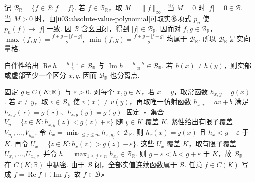 \begin{FAProof}
记 \(\displaystyle\mathcal B_{\mathbb R}=\{f\in\mathcal B:f=\overline f\}\). 若 \(\displaystyle f\in\mathcal B_{\mathbb R}\)，取 \(\displaystyle M=\|f\|_\infty\). 当 \(\displaystyle M=0\) 时 \(\displaystyle|f|=0\in\mathcal B\). 当 \(\displaystyle M>0\) 时，由\autoref{ii03:absolute-value-polynomial}可取实多项式 \(\displaystyle p_n\) 使 \(\displaystyle p_n(f)\to|f|\) 一致. 因 \(\displaystyle\mathcal B\) 含幺且闭，得到 \(\displaystyle|f|\in\mathcal B_{\mathbb R}\). 因而对 \(\displaystyle f,g\in\mathcal B_{\mathbb R}\)，
\(\displaystyle \max(f,g)=\frac{f+g+|f-g|}{2}, \; \min(f,g)=\frac{f+g-|f-g|}{2}\)
均属于 \(\displaystyle\mathcal B_{\mathbb R}\). 所以 \(\displaystyle\mathcal B_{\mathbb R}\) 是实向量格.

自伴性给出 \(\displaystyle\operatorname{Re}h=\frac{h+\overline h}{2}\in\mathcal B_{\mathbb R}\) 与 \(\displaystyle\operatorname{Im}h=\frac{h-\overline h}{2\mathrm{i}}\in\mathcal B_{\mathbb R}\). 若 \(\displaystyle h(x)\neq h(y)\)，则实部或虚部至少一个区分 \(\displaystyle x,y\). 因而 \(\displaystyle\mathcal B_{\mathbb R}\) 也分离点.

固定 \(\displaystyle g\in C(K;\mathbb R)\) 与 \(\displaystyle\varepsilon>0\). 对每个 \(\displaystyle x,y\in K\)，若 \(\displaystyle x=y\)，取常函数 \(\displaystyle h_{x,y}=g(x)\). 若 \(\displaystyle x\neq y\)，取 \(\displaystyle v\in\mathcal B_{\mathbb R}\) 使 \(\displaystyle v(x)\neq v(y)\)，再取唯一仿射函数 \(\displaystyle h_{x,y}=av+b\) 满足 \(\displaystyle h_{x,y}(x)=g(x)\)、\(\displaystyle h_{x,y}(y)=g(y)\). 固定 \(\displaystyle x\). 集合
\(\displaystyle V_y=\{z\in K:h_{x,y}(z)<g(z)+\varepsilon\}\)
随 \(\displaystyle y\in K\) 覆盖 \(\displaystyle K\). 紧性给出有限子覆盖 \(\displaystyle V_{y_1},\dots,V_{y_m}\). 令
\(\displaystyle h_x=\min_{1\leqslant j\leqslant m}h_{x,y_j}\in\mathcal B_{\mathbb R}.\)
则 \(\displaystyle h_x(x)=g(x)\) 且 \(\displaystyle h_x<g+\varepsilon\) 于 \(\displaystyle K\). 再令
\(\displaystyle U_x=\{z\in K:h_x(z)>g(z)-\varepsilon\}.\)
这些 \(\displaystyle U_x\) 覆盖 \(\displaystyle K\)，取有限子覆盖 \(\displaystyle U_{x_1},\dots,U_{x_n}\)，并令
\(\displaystyle h=\max_{1\leqslant j\leqslant n}h_{x_j}\in\mathcal B_{\mathbb R}.\)
则 \(\displaystyle g-\varepsilon<h<g+\varepsilon\) 于 \(\displaystyle K\)，故 \(\displaystyle\mathcal B_{\mathbb R}\) 在 \(\displaystyle C(K;\mathbb R)\) 中稠密. 由于 \(\displaystyle\mathcal B\) 闭，全部实值连续函数属于 \(\displaystyle\mathcal B\). 任意 \(\displaystyle f\in C(K)\) 写成 \(\displaystyle f=\operatorname{Re}f+\mathrm{i}\operatorname{Im}f\)，故 \(\displaystyle f\in\mathcal B\).\hfill\(\square\)
\end{FAProof}

